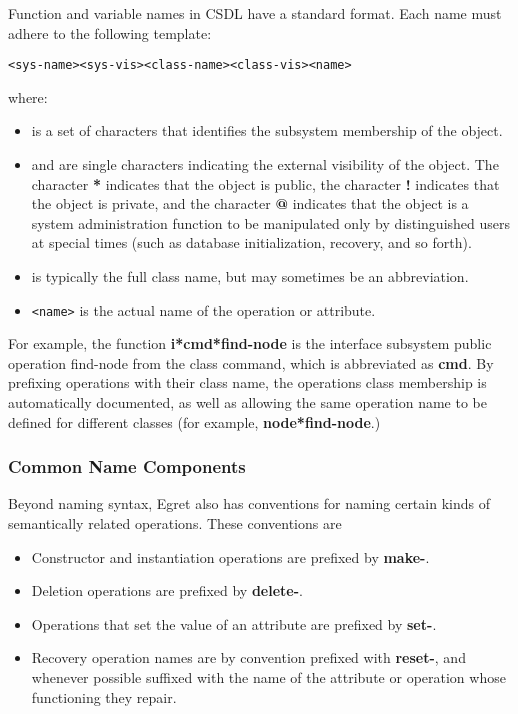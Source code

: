 Function and variable names in CSDL have a standard
format.\cite{csdl-93-02} Each name must adhere to the following template:

\small\begin{verbatim}
<sys-name><sys-vis><class-name><class-vis><name>
\end{verbatim}\normalsize

\noindent where:
\begin{itemize}
  
\item {\tt <sys-name>} is a set of characters that identifies the
  subsystem membership of the object.

  
\item {\tt <sys-vis>} and {\tt <class-vis>} are single characters
  indicating the external visibility of the object. The character {\bf
  *} indicates that the object is public, the character {\bf !}
  indicates that the object is private, and the character {\bf @}
  indicates that the object is a system administration function to be
  manipulated only by distinguished users at special times (such as
  database initialization, recovery, and so forth).
  
\item {\tt <class-name>} is typically the full class name, but may
  sometimes be an abbreviation.
  
\item {\tt <name>} is the actual name of the operation or attribute.

\end{itemize}

For example, the function {\bf i*cmd*find-node} is the interface
subsystem public operation {\sf find-node} from the class {\sf
command}, which is abbreviated as {\bf cmd}.  By prefixing operations
with their class name, the operations class membership is
automatically documented, as well as allowing the same operation name
to be defined for different classes (for example, {\bf
node*find-node}.)

\subsubsection{Common Name Components}

Beyond naming syntax, Egret also has conventions for naming certain
kinds of semantically related operations.  These conventions are

\begin{itemize}
  
\item Constructor and instantiation operations are prefixed by {\bf
  make-}.
  
\item Deletion operations are prefixed by {\bf delete-}.
  
\item Operations that set the value of an attribute are prefixed by
  {\bf set-}.
  
\item Recovery operation names are by convention prefixed with {\bf
  reset-}, and whenever possible suffixed with the name of the attribute
  or operation whose functioning they repair.
\end{itemize}


